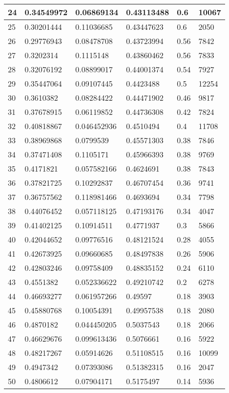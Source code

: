 \begin{longtable}{|l|l|l|l|l|l|}
24 & 0.34549972 & 0.06869134 & 0.43113488 & 0.6 & 10067 \\ \hline 
25 & 0.30201444 & 0.11036685 & 0.43447623 & 0.6 & 2050 \\ \hline 
26 & 0.29776943 & 0.08478708 & 0.43723994 & 0.56 & 7842 \\ \hline 
27 & 0.3202314 & 0.1115148 & 0.43860462 & 0.56 & 7833 \\ \hline 
28 & 0.32076192 & 0.08899017 & 0.44001374 & 0.54 & 7927 \\ \hline 
29 & 0.35447064 & 0.09107445 & 0.4423488 & 0.5 & 12254 \\ \hline 
30 & 0.3610382 & 0.08284422 & 0.44471902 & 0.46 & 9817 \\ \hline 
31 & 0.37678915 & 0.06119852 & 0.44736308 & 0.42 & 7824 \\ \hline 
32 & 0.40818867 & 0.046452936 & 0.4510494 & 0.4 & 11708 \\ \hline 
33 & 0.38969868 & 0.0799539 & 0.45571303 & 0.38 & 7846 \\ \hline 
34 & 0.37471408 & 0.1105171 & 0.45966393 & 0.38 & 9769 \\ \hline 
35 & 0.4171821 & 0.057582166 & 0.4624691 & 0.38 & 7843 \\ \hline 
36 & 0.37821725 & 0.10292837 & 0.46707454 & 0.36 & 9741 \\ \hline 
37 & 0.36757562 & 0.118981466 & 0.4693694 & 0.34 & 7798 \\ \hline 
38 & 0.44076452 & 0.057118125 & 0.47193176 & 0.34 & 4047 \\ \hline 
39 & 0.41402125 & 0.10914511 & 0.4771937 & 0.3 & 5866 \\ \hline 
40 & 0.42044652 & 0.09776516 & 0.48121524 & 0.28 & 4055 \\ \hline 
41 & 0.42673925 & 0.09660685 & 0.48497838 & 0.26 & 5906 \\ \hline 
42 & 0.42803246 & 0.09758409 & 0.48835152 & 0.24 & 6110 \\ \hline 
43 & 0.4551382 & 0.052336622 & 0.49210742 & 0.2 & 6278 \\ \hline 
44 & 0.46693277 & 0.061957266 & 0.49597 & 0.18 & 3903 \\ \hline 
45 & 0.45880768 & 0.10054391 & 0.49957538 & 0.18 & 2080 \\ \hline 
46 & 0.4870182 & 0.044450205 & 0.5037543 & 0.18 & 2066 \\ \hline 
47 & 0.46629676 & 0.099613436 & 0.5076661 & 0.16 & 5922 \\ \hline 
48 & 0.48217267 & 0.05914626 & 0.51108515 & 0.16 & 10099 \\ \hline 
49 & 0.4947342 & 0.07393086 & 0.51382315 & 0.16 & 2047 \\ \hline 
50 & 0.4806612 & 0.07904171 & 0.5175497 & 0.14 & 5936 \\ \hline 
\end{longtable}